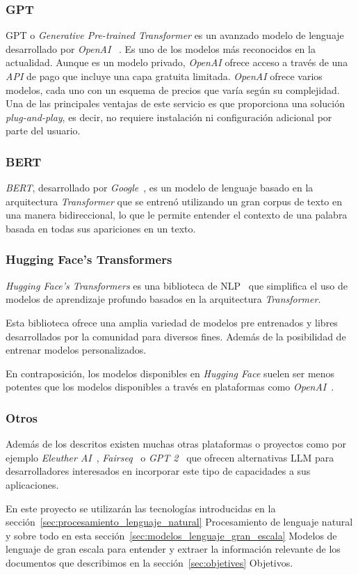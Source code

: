 \subsubsection*{GPT}
GPT o \textit{Generative Pre-trained Transformer} es un avanzado modelo de lenguaje desarrollado por \textit{OpenAI}
~\cite{article_brown_2020}.
Es uno de los modelos más reconocidos en la actualidad.
Aunque es un modelo privado, \textit{OpenAI} ofrece acceso a través de una \textit{API} de pago que incluye una capa
gratuita limitada.
\textit{OpenAI} ofrece varios modelos, cada uno con un esquema de precios que varía según su complejidad.
Una de las principales ventajas de este servicio es que proporciona una solución \textit{plug-and-play}, es decir, no
requiere instalación ni configuración adicional por parte del usuario.

\subsubsection*{BERT}
\textit{BERT}, desarrollado por \textit{Google}~\cite{article_devlin_2019}, es un modelo de lenguaje basado en la
arquitectura \textit{Transformer} que se entrenó utilizando un gran corpus de texto en una manera bidireccional, lo
que le permite entender el contexto de una palabra basada en todas sus apariciones en un texto.

\subsubsection*{Hugging Face's Transformers}

\textit{Hugging Face's Transformers} es una biblioteca de NLP~\cite{article_wolf_2020} que simplifica el uso de modelos
de aprendizaje profundo basados en la arquitectura \textit{Transformer}.

Esta biblioteca ofrece una amplia variedad de modelos pre entrenados y libres desarrollados por la comunidad para
diversos fines.
Además de la posibilidad de entrenar modelos personalizados.

En contraposición, los modelos disponibles en \textit{Hugging Face}
suelen ser menos potentes que los modelos disponibles a través en plataformas como
\textit{OpenAI}~\cite{url_chatgpt_vs_huggingchat}.

\subsubsection*{Otros}

Además de los descritos existen muchas otras plataformas o proyectos como por ejemplo
\textit{Eleuther AI}~\cite{url_eleutherai}, \textit{Fairseq}~\cite{url_fairseq} o \textit{GPT 2}~\cite{url_openai_gpt2}
que ofrecen alternativas LLM para desarrolladores interesados en incorporar este tipo de capacidades a sus aplicaciones.

En este proyecto se utilizarán las tecnologías introducidas en la sección~\ref{sec:procesamiento_lenguaje_natural}
Procesamiento de lenguaje natural y sobre todo en esta sección~\ref{sec:modelos_lenguaje_gran_escala}
Modelos de lenguaje de gran escala para entender y extraer la información relevante de los documentos que describimos
en la sección~\ref{sec:objetives} Objetivos.
